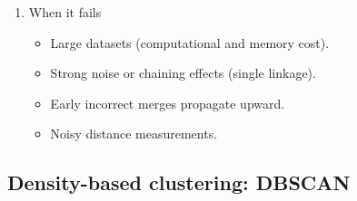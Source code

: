 \documentclass{article}
\begin{document}
\begin{enumerate}
\item When it fails
\begin{itemize}
\item Large datasets (computational and memory cost).
\item Strong noise or chaining effects (single linkage).
\item Early incorrect merges propagate upward.
\item Noisy distance measurements.
\end{itemize}

\end{enumerate}

\subsection*{Density-based clustering: DBSCAN}
\end{document}
